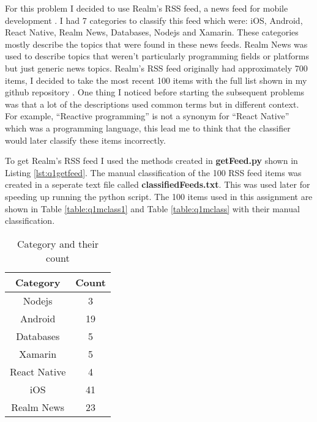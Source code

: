 \documentclass[letterpaper,11pt]{article}
\newcommand*{\srcPath}{../src}%
\begin{document}
For this problem I decided to use Realm's RSS feed, a news feed for mobile development \cite{realmref}. I had 7 categories to classify this feed which were: iOS, Android, React Native, Realm News, Databases, Nodejs and Xamarin. These categories mostly describe the topics that were found in these news feeds. Realm News was used to describe topics that weren't particularly programming fields or platforms but just generic news topics. Realm's RSS feed originally had approximately 700 items, I decided to take the most recent 100 items with the full list shown in my github repository \cite{github}. One thing I noticed before starting the subsequent problems was that a lot of the descriptions used common terms but in different context. For example, ``Reactive programming'' is not a synonym for ``React Native'' which was a programming language, this lead me to think that the classifier would later classify these items incorrectly.

To get Realm's RSS feed I used the methods created in \textbf{getFeed.py} shown in Listing \ref{lst:q1getfeed}. The manual classification of the 100 RSS feed items was created in a seperate text file called \textbf{classifiedFeeds.txt}. This was used later for speeding up running the python script. The 100 items used in this assignment are shown in Table \ref{table:q1mclass1} and Table \ref{table:q1mclass} with their manual classification.

\begin{table}[h]
\centering
\begin{adjustbox}{max width=\linewidth}
\begin{tabular}{ | c | c |}
\hline
\textbf{Category} & \textbf{Count}  \\
\hline
Nodejs & 3 \\ 
Android & 19 \\ 
Databases & 5  \\ 
Xamarin & 5  \\ 
React Native & 4 \\ 
iOS & 41  \\ 
Realm News & 23 \\ 
\hline
\end{tabular}
\end{adjustbox}
\caption{Category and their count}
\label{table:q3calcs}
\end{table}

\clearpage

 
\end{document}
